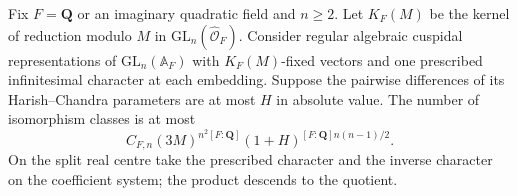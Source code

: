 \begin{proposition}\label{rk3:count}
Fix \(F=\mathbf Q\) or an imaginary quadratic field and \(n\ge2\).
Let \(K_F(M)\) be the kernel of reduction modulo \(M\) in
\(\mathrm{GL}_n(\widehat{\mathcal O}_F)\).
Consider regular algebraic cuspidal representations of
\(\mathrm{GL}_n(\mathbb A_F)\) with \(K_F(M)\)-fixed vectors and
one prescribed infinitesimal character at each embedding. Suppose the
pairwise differences of its Harish--Chandra parameters are at most \(H\)
in absolute value. The number of isomorphism classes is at most
\[
 C_{F,n}(3M)^{n^2[F:\mathbf Q]}
       (1+H)^{[F:\mathbf Q]n(n-1)/2}.
\]
On the split real centre take the prescribed character and the inverse
character on the coefficient system; the product descends to the quotient.
\end{proposition}
